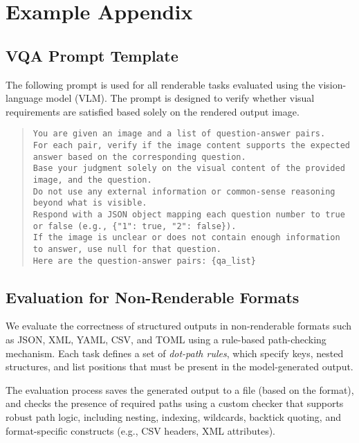 
\section{Example Appendix}
\label{sec:appendix}

\subsection{VQA Prompt Template}
\label{app:vqa-prompt}

The following prompt is used for all renderable tasks evaluated using the vision-language model (VLM). The prompt is designed to verify whether visual requirements are satisfied based solely on the rendered output image.

\begin{quote}
\texttt{You are given an image and a list of question-answer pairs. \\
For each pair, verify if the image content supports the expected answer based on the corresponding question. \\
Base your judgment solely on the visual content of the provided image, and the question. \\
Do not use any external information or common-sense reasoning beyond what is visible. \\
Respond with a JSON object mapping each question number to true or false (e.g., \{"1": true, "2": false\}). \\
If the image is unclear or does not contain enough information to answer, use \texttt{null} for that question. \\
Here are the question-answer pairs: \{qa\_list\}}
\end{quote}


\subsection{Evaluation for Non-Renderable Formats}
\label{sec:nonrenderable-eval}

We evaluate the correctness of structured outputs in non-renderable formats such as JSON, XML, YAML, CSV, and TOML using a rule-based path-checking mechanism. Each task defines a set of \textit{dot-path rules}, which specify keys, nested structures, and list positions that must be present in the model-generated output.

The evaluation process saves the generated output to a file (based on the format), and checks the presence of required paths using a custom checker that supports robust path logic, including nesting, indexing, wildcards, backtick quoting, and format-specific constructs (e.g., CSV headers, XML attributes).

